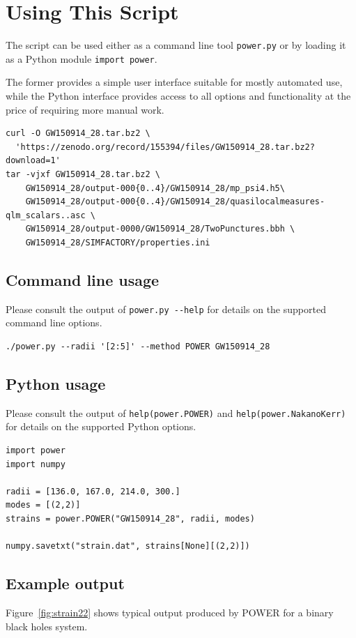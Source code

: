\section{Using This Script}

The script can be used either as a command line tool \texttt{power.py} or by
loading it as a Python module \texttt{import power}.

The former provides a simple user interface suitable for mostly automated use,
while the Python interface provides access to all options and functionality at
the price of requiring more manual work.

\begin{verbatim}
curl -O GW150914_28.tar.bz2 \
  'https://zenodo.org/record/155394/files/GW150914_28.tar.bz2?download=1'
tar -vjxf GW150914_28.tar.bz2 \
    GW150914_28/output-000{0..4}/GW150914_28/mp_psi4.h5\
    GW150914_28/output-000{0..4}/GW150914_28/quasilocalmeasures-qlm_scalars..asc \
    GW150914_28/output-0000/GW150914_28/TwoPunctures.bbh \
    GW150914_28/SIMFACTORY/properties.ini
\end{verbatim}


\subsection{Command line usage}

Please consult the output of \verb|power.py --help| for details on the
supported command line options.

\begin{verbatim}
./power.py --radii '[2:5]' --method POWER GW150914_28
\end{verbatim}

\subsection{Python usage}

Please consult the output of \verb|help(power.POWER)| and
\verb|help(power.NakanoKerr)| for details on the
supported Python options.

\begin{verbatim}
import power
import numpy

radii = [136.0, 167.0, 214.0, 300.]
modes = [(2,2)]
strains = power.POWER("GW150914_28", radii, modes)

numpy.savetxt("strain.dat", strains[None][(2,2)])
\end{verbatim}

\subsection{Example output}
Figure~\ref{fig:strain22} shows typical output produced by POWER for a binary
black holes system.

